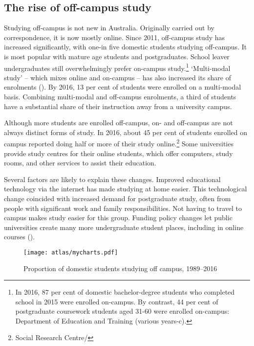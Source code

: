 \documentclass{grattan}
\begin{document}
%
\subsection{The rise of off-campus study}\label{subsec:the-rise-of-off-campus-study}

Studying off-campus is not new in Australia. Originally carried out by correspondence, it is now mostly online. Since 2011, off-campus study has increased significantly, with one-in five domestic students studying off-campus. It is most popular with mature age students and postgraduates. School leaver undergraduates still overwhelmingly prefer on-campus study.\footnote{In 2016, 87 per cent of domestic bachelor-degree students who completed school in 2015 were enrolled on-campus. By contrast, 44 per cent of postgraduate coursework students aged 31-60 were enrolled on-campus: Department of Education and Training (various years-c).} `Multi-modal study' -- which mixes online and on-campus -- has also increased its share of enrolments (). By 2016, 13 per cent of students were enrolled on a multi-modal basis. Combining multi-modal and off-campus enrolments, a third of students have a substantial share of their instruction away from a university campus.

Although more students are enrolled off-campus, on- and off-campus are not always distinct forms of study. In 2016, about 45 per cent of students enrolled on campus reported doing half or more of their study online.\footnote{Social Research Centre/\textcite[][]{DepartmentofEducationandTraining20182018australiancom}} Some universities provide study centres for their online students, which offer computers, study rooms, and other services to assist their education.

Several factors are likely to explain these changes. Improved educational technology via the internet has made studying at home easier. This technological change coincided with increased demand for postgraduate study, often from people with significant work and family responsibilities. Not having to travel to campus makes study easier for this group. Funding policy changes let public universities create many more undergraduate student places, including in online courses ().

    \begin{figure} %
    \caption{Proportion of domestic students studying off campus, 1989--2016}\label{fig:proportion-of-domestic-students-studying-off-campus-19892016}
    \texttt{[image: atlas/mycharts.pdf]}
    \end{figure}
\end{document}
